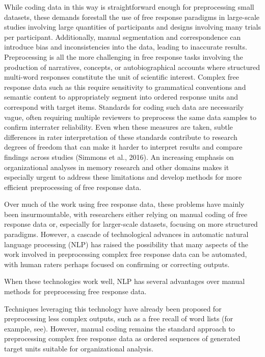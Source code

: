 \documentclass[
  letterpaper,
  DIV=11,
  numbers=noendperiod]{scrreprt}
\begin{document}
While coding data in this way is straightforward enough for
preprocessing small datasets, these demands forestall the use of free
response paradigms in large-scale studies involving large quantities of
participants and designs involving many trials per participant.
Additionally, manual segmentation and correspondence can introduce bias
and inconsistencies into the data, leading to inaccurate results.
Preprocessing is all the more challenging in free response tasks
involving the production of narratives, concepts, or autobiographical
accounts where structured multi-word responses constitute the unit of
scientific interest. Complex free response data such as this require
sensitivity to grammatical conventions and semantic content to
appropriately segment into ordered response units and correspond with
target items. Standards for coding such data are necessarily vague,
often requiring multiple reviewers to preprocess the same data samples
to confirm interrater reliability. Even when these measures are taken,
subtle differences in rater interpretation of these standards contribute
to research degrees of freedom that can make it harder to interpret
results and compare findings across studies (Simmons et al., 2016). An
increasing emphasis on organizational analyses in memory research and
other domains makes it especially urgent to address these limitations
and develop methods for more efficient preprocessing of free response
data.

Over much of the work using free response data, these problems have
mainly been insurmountable, with researchers either relying on manual
coding of free response data or, especially for larger-scale datasets,
focusing on more structured paradigms. However, a cascade of
technological advances in automatic natural language processing (NLP)
has raised the possibility that many aspects of the work involved in
preprocessing complex free response data can be automated, with human
raters perhaps focused on confirming or correcting outputs.

When these technologies work well, NLP has several advantages over
manual methods for preprocessing free response data.

Techniques leveraging this technology have already been proposed for
preprocessing less complex outputs, such as a free recall of word lists
(for example, see). However, manual coding remains the standard approach
to preprocessing complex free response data as ordered sequences of
generated target units suitable for organizational analysis.
\end{document}
